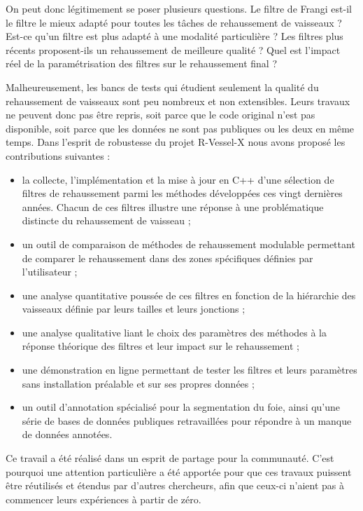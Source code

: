 On peut donc légitimement se poser plusieurs questions. Le filtre de Frangi est-il le filtre le mieux adapté pour toutes les tâches de rehaussement de vaisseaux ? Est-ce qu'un filtre est plus adapté à une modalité particulière ? Les filtres plus récents proposent-ils un rehaussement de meilleure qualité ? Quel est l'impact réel de la paramétrisation des filtres sur le rehaussement final ?

Malheureusement, les bancs de tests qui étudient seulement la qualité du rehaussement de vaisseaux sont peu nombreux et non extensibles. Leurs travaux ne peuvent donc pas être repris, soit parce que le code original n'est pas disponible, soit parce que les données ne sont pas publiques ou les deux en même temps. Dans l'esprit de robustesse du projet R-Vessel-X nous avons proposé les contributions suivantes :

\begin{itemize}
\item la collecte, l'implémentation et la mise à jour en C++ d'une sélection de filtres de rehaussement parmi les méthodes développées ces vingt dernières années. Chacun de ces filtres illustre une réponse à une problématique distincte du rehaussement de vaisseau ;
\item un outil de comparaison de méthodes de rehaussement modulable permettant de comparer le rehaussement dans des zones spécifiques définies par l'utilisateur ;
\item une analyse quantitative poussée de ces filtres en fonction de la hiérarchie des vaisseaux définie par leurs tailles et leurs jonctions ;
\item une analyse qualitative liant le choix des paramètres des méthodes à la réponse théorique des filtres et leur impact sur le rehaussement ;
\item une démonstration en ligne permettant de tester les filtres et leurs paramètres sans installation préalable et sur ses propres données ;
\item un outil d'annotation spécialisé pour la segmentation du foie, ainsi qu'une série de bases de données publiques retravaillées pour répondre à un manque de données annotées.
\end{itemize}

Ce travail a été réalisé dans un esprit de partage pour la communauté. C'est pourquoi une attention particulière a été apportée pour que ces travaux puissent être réutilisés et étendus par d'autres chercheurs, afin que ceux-ci n'aient pas à commencer leurs expériences à partir de zéro.

